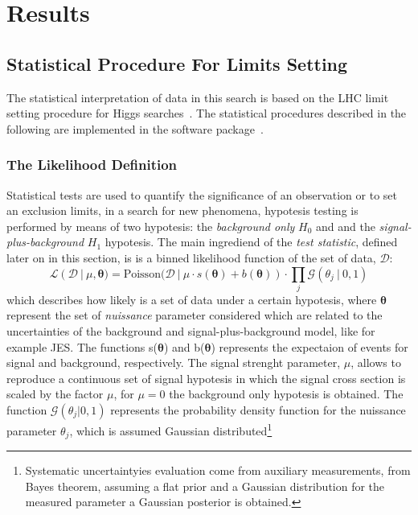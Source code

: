 
\section{Results}
\label{sec:result}

\subsection{Statistical Procedure For Limits Setting}
\label{sec:limits}
The statistical interpretation of data in this search is based on the LHC limit 
setting procedure for Higgs searches~\cite{lhclimits}. The statistical procedures described in the 
following are implemented in the software package~\cite{roofit,roostat,histfactory}.

\subsubsection{The Likelihood Definition}
Statistical tests are used to quantify the significance of an observation or to set an exclusion limits, 
in a search for new phenomena, hypotesis testing is performed by means of two hypotesis: 
the \textit{background only} $H_0$ and and the \textit{signal-plus-background} $H_1$ hypotesis.  
The main ingrediend of the \emph{test statistic}, defined later on in this section, is 
is a binned likelihood function of the set of data, $\mathcal{D}$:
\begin{equation}\label{likelihood}
\mathcal{L}(\mathcal{D}~|~\mu, \boldsymbol{\theta}) = \text{Poisson(}\mathcal{D}~ |~ \mu \cdot s(\boldsymbol{\theta}) 
	+ b(\boldsymbol{\theta})) \cdot \prod_{j} \mathcal{G}(\theta_j ~|~ 0, 1)
\end{equation}
which describes how likely is a set of data under a certain hypotesis,
where $\boldsymbol{\theta}$ represent the set of \emph{nuissance} parameter considered which are related to
the uncertainties of the background and signal-plus-background model, like for example JES. 
The functions s($\boldsymbol{\theta}$) and  b($\boldsymbol{\theta}$)
represents the expectaion of events for signal and background, respectively. The signal strenght parameter, $\mu$,
allows to reproduce a continuous set of signal hypotesis in which the signal cross section is scaled by the factor $\mu$,
for $\mu = 0$ the background only hypotesis is obtained. The function $\mathcal{G}(\theta_j | 0,1)$
represents the probability density function for the nuissance parameter $\theta_j$, which is assumed 
Gaussian distributed\footnote{Systematic uncertaintyies evaluation  come from auxiliary measurements, from Bayes theorem,
	assuming a flat prior and a Gaussian distribution for the measured parameter  a Gaussian posterior is obtained.
				}
